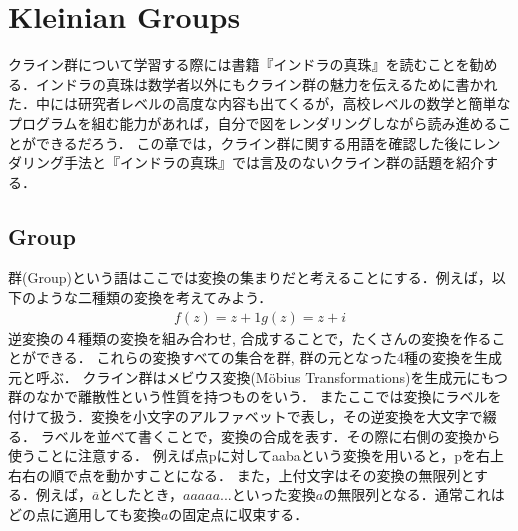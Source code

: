 
\section{Kleinian Groups}
クライン群について学習する際には書籍『インドラの真珠』\cite{indra}を読むことを勧める．インドラの真珠は数学者以外にもクライン群の魅力を伝えるために書かれた．中には研究者レベルの高度な内容も出てくるが，高校レベルの数学と簡単なプログラムを組む能力があれば，自分で図をレンダリングしながら読み進めることができるだろう．
この章では，クライン群に関する用語を確認した後にレンダリング手法と『インドラの真珠』では言及のないクライン群の話題を紹介する．

\subsection{Group}
群(Group)という語はここでは変換の集まりだと考えることにする．例えば，以下のような二種類の変換を考えてみよう．
\begin{eqnarray*}
 f(z) = z + 1
 g(z) = z + i
\end{eqnarray*}
逆変換の４種類の変換を組み合わせ, 合成することで，たくさんの変換を作ることができる．
これらの変換すべての集合を群, 群の元となった4種の変換を生成元と呼ぶ．
クライン群はメビウス変換(M\"obius Transformations)を生成元にもつ群のなかで離散性という性質を持つものをいう．
またここでは変換にラベルを付けて扱う．変換を小文字のアルファベットで表し，その逆変換を大文字で綴る．
ラベルを並べて書くことで，変換の合成を表す．その際に右側の変換から使うことに注意する．
例えば点pに対してaabaという変換を用いると，pを右上右右の順で点を動かすことになる．
また，上付文字はその変換の無限列とする．例えば，$\overline{a}$としたとき，$aaaaa...$といった変換$a$の無限列となる．通常これはどの点に適用しても変換$a$の固定点に収束する．



